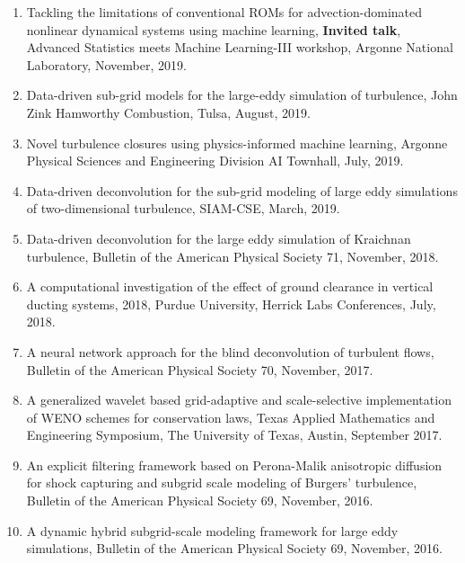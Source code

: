 \documentclass[letterpaper]{article}
\begin{document}
\begin{enumerate}
\item Tackling the limitations of conventional ROMs for advection-dominated nonlinear dynamical systems using machine learning, \textbf{Invited talk}, Advanced Statistics meets Machine Learning-III workshop, Argonne National Laboratory, November, 2019.

\item Data-driven sub-grid models for the large-eddy simulation of turbulence, John Zink Hamworthy Combustion, Tulsa, August, 2019.

\item Novel turbulence closures using physics-informed machine learning, Argonne Physical Sciences and Engineering Division AI Townhall, July, 2019. 

\item Data-driven deconvolution for the sub-grid modeling of large eddy simulations of two-dimensional turbulence, SIAM-CSE, March, 2019.

\item Data-driven deconvolution for the large eddy simulation of Kraichnan turbulence, Bulletin of the American Physical Society 71, November, 2018.

\item A computational investigation of the effect of ground clearance in vertical ducting systems, 2018, Purdue University, Herrick Labs Conferences, July, 2018. 

\item A neural network approach for the blind deconvolution of turbulent flows, Bulletin of the American Physical Society 70, November, 2017.

\item A generalized wavelet based grid-adaptive and scale-selective implementation of WENO schemes for conservation laws, Texas Applied Mathematics and Engineering Symposium, The University of Texas, Austin, September 2017.

\item An explicit filtering framework based on Perona-Malik anisotropic diffusion for shock capturing and subgrid scale modeling of Burgers' turbulence, Bulletin of the American Physical Society 69, November, 2016.

\item A dynamic hybrid subgrid-scale modeling framework for large eddy simulations, Bulletin of the American Physical Society 69, November, 2016.

\end{enumerate}
\end{document}

